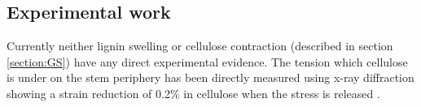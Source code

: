 \subsection{Experimental work}
\label{subsection:Experimental work}
Currently neither lignin swelling or cellulose contraction (described in section
\ref{section:GS}) have any direct experimental evidence. The tension which cellulose is under
on the stem periphery has been directly measured using x-ray diffraction showing
a strain reduction of 0.2\% in cellulose when the stress is released \citep{Clair_2006}.
